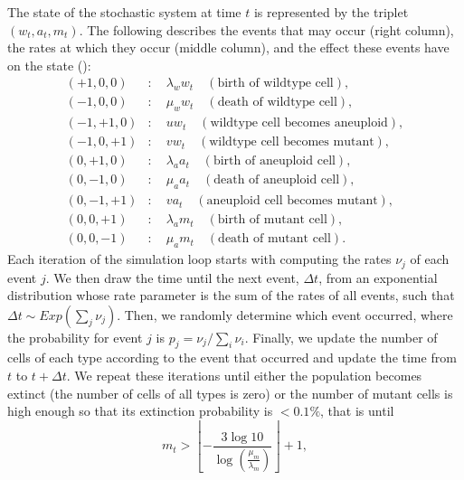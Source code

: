 \documentclass[12pt]{extarticle}
\begin{document}
The state of the stochastic system at time $t$ is represented by the triplet $\left(w_t,a_t,m_t\right)$. The following describes the events that may occur (right column), the rates at which they occur (middle column), and the effect these events have on the state ():
\begin{subequations}
\begin{flalign*}
(+1,0,0)&:\quad \lambda_ww_t\quad\left(\text{birth of wildtype cell}\right),\\
(-1,0,0)&:\quad \mu_ww_t\quad\left(\text{death of wildtype cell}\right),\\
(-1,+1,0)&:\quad uw_t\quad\left(\text{wildtype cell becomes aneuploid}\right),\\
(-1,0,+1)&:\quad vw_t\quad\left(\text{wildtype cell becomes mutant}\right),\\
(0,+1,0)&:\quad \lambda_aa_t\quad\left(\text{birth of aneuploid cell}\right),\\
(0,-1,0)&:\quad \mu_aa_t\quad\left(\text{death of aneuploid cell}\right),\\
(0,-1,+1)&:\quad va_t\quad\left(\text{aneuploid cell becomes mutant}\right),\\
(0,0,+1)&:\quad \lambda_am_t\quad\left(\text{birth of mutant cell}\right),\\
(0,0,-1)&:\quad \mu_am_t\quad\left(\text{death of mutant cell}\right).
\end{flalign*}
\end{subequations}
Each iteration of the simulation loop starts with computing the rates $\nu_j$ of each event $j$.
We then draw the time until the next event, $\Delta t$, from an exponential distribution whose rate parameter is the sum of the rates of all events, such that $\Delta t \sim \textit{Exp}(\sum_j \nu_j)$.
Then, we randomly determine which event occurred, where the probability for event $j$ is $p_j=\nu_j/\sum_i \nu_i$.
Finally, we update the number of cells of each type according to the event that occurred and update the time from $t$ to $t+\Delta t$. %
We repeat these iterations until either the population becomes extinct (the number of cells of all types is zero) or the number of mutant cells is high enough so that its extinction probability is $<0.1\%$, that is until
\begin{equation*}
m_t>\left\lfloor-\frac{3\log10}{\log\left(\frac{\mu_m}{\lambda_m}\right)}\right\rfloor+1,
\end{equation*}
\end{document}
